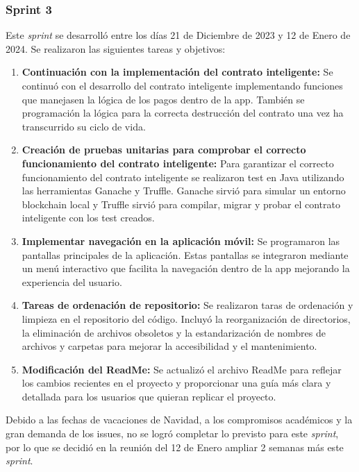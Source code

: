 \subsubsection{Sprint 3}

Este \textit{sprint} se desarrolló entre los días 21 de Diciembre de 2023 y 12 de Enero de 2024. Se realizaron las siguientes tareas y objetivos:

\begin{enumerate}

\item \textbf{Continuación con la implementación del contrato inteligente:} Se continuó con el desarrollo del contrato inteligente implementando funciones que manejasen la lógica de los pagos dentro de la app. También se programación la lógica para la correcta destrucción del contrato una vez ha transcurrido su ciclo de vida.

\item \textbf{Creación de pruebas unitarias para comprobar el correcto funcionamiento del contrato inteligente:}  Para garantizar el correcto funcionamiento del contrato inteligente se realizaron test en Java utilizando las herramientas Ganache y Truffle.
Ganache sirvió para simular un entorno blockchain local y Truffle sirvió para compilar, migrar y probar el contrato inteligente con los test creados.

\item \textbf{Implementar navegación en la aplicación móvil:} Se programaron las pantallas principales de la aplicación. Estas pantallas se integraron mediante un menú interactivo que facilita la navegación dentro de la app mejorando la experiencia del usuario.

\item \textbf{Tareas de ordenación de repositorio:} Se realizaron taras de ordenación y limpieza en el repositorio del código. Incluyó la reorganización de directorios, la eliminación de archivos obsoletos y la estandarización de nombres de archivos y carpetas para mejorar la accesibilidad y el mantenimiento.

\item \textbf{Modificación del ReadMe:} Se actualizó el archivo ReadMe para reflejar los cambios recientes en el proyecto y proporcionar una guía más clara y detallada para los usuarios que quieran replicar el proyecto.

\end{enumerate}

Debido a las fechas de vacaciones de Navidad, a los compromisos académicos y la gran demanda de los issues, no se logró completar lo previsto para este \textit{sprint}, por lo que se decidió en la reunión del 12 de Enero ampliar 2 semanas más este \textit{sprint}.


